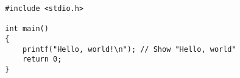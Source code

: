 	\begin{verbatim}
		#include <stdio.h>
		
		int main() 
		{
			printf("Hello, world!\n"); // Show "Hello, world"
			return 0;
		}
	\end{verbatim}

